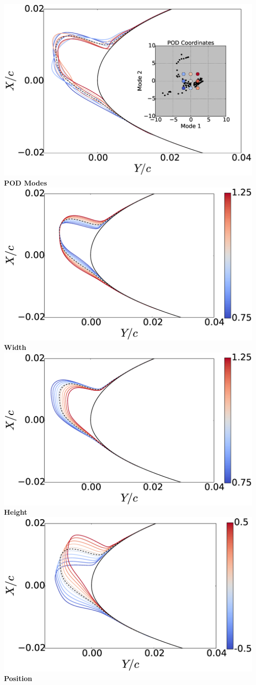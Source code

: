 \documentclass[9pt]{beamer}
\begin{document}
\begin{frame}
\begin{columns}[c]
    \centering
    \includegraphics[width=.75\textwidth]{DifferentShapesPODModes} \\
    \bf{POD Modes} \\
    \includegraphics[width=.75\textwidth]{DifferentShapesWidth} \\
    \bf{Width}
    \centering
    \includegraphics[width=.75\textwidth]{DifferentShapesHeight} \\
    {\bf Height} \\
    \includegraphics[width=.75\textwidth]{DifferentShapesPosition} \\
    {\bf Position}    
\end{columns}


\end{frame}
\end{document}
